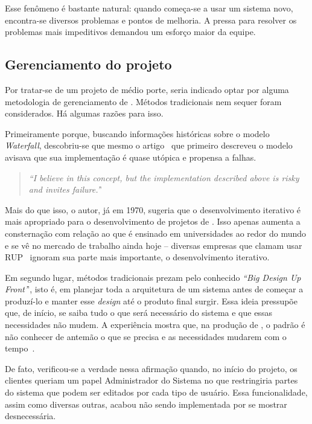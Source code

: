 Esse fenômeno é bastante natural: quando começa-se a usar um sistema novo, encontra-se diversos problemas e pontos de melhoria. A pressa para resolver os problemas mais impeditivos demandou um esforço maior da equipe.

\subsection{Gerenciamento do projeto}

Por tratar-se de um projeto de médio porte, seria indicado optar por alguma metodologia de gerenciamento de \software{}. Métodos tradicionais nem sequer foram considerados. Há algumas razões para isso.

Primeiramente porque, buscando informações históricas sobre o modelo \textit{Waterfall}, descobriu-se que mesmo o artigo~\cite{waterfall} que primeiro descreveu o modelo avisava que sua implementação é quase utópica e propensa a falhas.

\begin{quote}
\textit{``I believe in this concept, but the implementation described above is risky and invites failure.'}'
\end{quote}

Mais do que isso, o autor, já em 1970, sugeria que o desenvolvimento iterativo é mais apropriado para o desenvolvimento de projetos de \software{}. Isso apenas aumenta a consternação com relação ao que é ensinado em universidades ao redor do mundo e se vê no mercado de trabalho ainda hoje -- diversas empresas que clamam usar RUP~\cite{rup} ignoram sua parte mais importante, o desenvolvimento iterativo.

Em segundo lugar, métodos tradicionais prezam pelo conhecido \textit{``Big Design Up Front'}', isto é, em planejar toda a arquitetura de um sistema antes de começar a produzí-lo e manter esse \textit{design} até o produto final surgir. Essa ideia pressupõe que, de início, se saiba tudo o que será necessário do sistema e que essas necessidades não mudem. A experiência mostra que, na produção de \software{}, o padrão é não conhecer de antemão o que se precisa e as necessidades mudarem com o tempo~\cite{change}.

De fato, verificou-se a verdade nessa afirmação quando, no início do projeto, os clientes queriam um papel Administrador do Sistema no \calopsita{} que restringiria partes do sistema que podem ser editados por cada tipo de usuário. Essa funcionalidade, assim como diversas outras, acabou não sendo implementada por se mostrar desnecessária.


